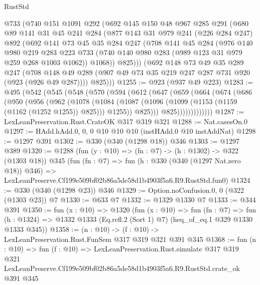 \begin{lexlean}{RustStd}
\begin{coremodule}
    @733
    (@740
      @151
      @1091
      @292
      (@692
        @145
        @150
        @48
        @967
        @285
        @291
        (@680
          @89
          @141
          @31
          @45
          @241
          @284
          (@877
            @143
            @31
            @979
            @241
            (@226 @284 @247)
            @892
            (@692
              @141
              @73
              @45
              @35
              @284
              @247
              (@708
                @141
                @45
                @284
                (@976
                  @140
                  @980
                  @219
                  @283
                  @223
                  @733
                  (@740 @140 @980 @283 (@989 @123 @31 @979 @259 @268 @1003 @1062))
                  @1068))
              @825)))
        (@692
          @148
          @73
          @49
          @35
          @289
          @247
          (@708 @148 @49 @289 (@907 @49 @73 @35 @219 @247 @287 @731 @920 (@923 (@926 @49 @287))))
          @825)))
@1255 := @923 (@937 @49 @223)
@1283 := @495
    (@542
      (@545
        (@548
          (@570
            (@594
              (@612
                (@647
                  (@659
                    (@664
                      (@674
                        (@686
                          (@950
                            (@956
                              (@962
                                (@1078
                                  (@1084
                                    (@1087
                                      (@1096
                                        (@1099 (@1153 (@1159 (@1162 (@1252 @1255)) @825)))
                                        @1255))
                                    @825)))
                              @825)))))))))))))
@1287 := LexLeanPreservation.Rust.CrateOK @317 @319 @321
@1288 := Nat.casesOn.{0}
@1297 := HAdd.hAdd.{0, 0, 0} @10 @10 @10 (instHAdd.{0} @10 instAddNat)
@1298 := @1297 @391
@1302 := @330 (@340 (@1298 @18)) @346
@1303 := @1297 @389
@1320 := @1288
    (fun (y : @10) => (fn : @7) -> (h : @1302) -> @322 (@1303 @18))
    @345
    (fun (fn : @7) =>
    fun (h : @330 (@340 (@1297 Nat.zero @18)) @346) =>
    LexLeanPreserve.Cf199e509bf02b86a5de58d1b4903f5a6.R9.RustStd.fun0)
@1324 := @330 (@340 (@1298 @23)) @346
@1329 := Option.noConfusion.{0, 0} (@322 (@1303 @23)) @7
@1330 := @633 @7
@1332 := @1329 @1330 @7
@1333 := @344 @391
@1350 := fun (x : @10) =>
  @1320
    (fun (x : @10) =>
    fun (fn : @7) =>
    fun (h : @1324) => @1332 @1333 (Eq.refl.{2} (Sort 1) @7) (heq_of_eq.{1} @329 @1330 @1333 @345))
@1358 := (n : @10) -> (f : @10) -> LexLeanPreservation.Rust.FunSem @317 @319 @321 @391 @345
@1368 := fun (n : @10) =>
  fun (f : @10) =>
  LexLeanPreservation.Rust.simulate
    @317
    @319
    @321
    LexLeanPreserve.Cf199e509bf02b86a5de58d1b4903f5a6.R9.RustStd.crate_ok
    @391
    @345
\end{coremodule}
\end{lexlean}
